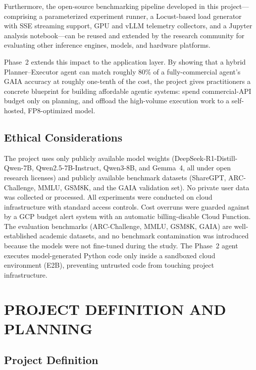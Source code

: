 \documentclass[a4paper,12pt]{report}
\begin{document}
Furthermore, the open-source benchmarking pipeline developed in this project---comprising a parameterized experiment runner, a Locust-based load generator with SSE streaming support, GPU and vLLM telemetry collectors, and a Jupyter analysis notebook---can be reused and extended by the research community for evaluating other inference engines, models, and hardware platforms.

Phase~2 extends this impact to the application layer. By showing that a hybrid Planner--Executor agent can match roughly 80\% of a fully-commercial agent's GAIA accuracy at roughly one-tenth of the cost, the project gives practitioners a concrete blueprint for building affordable agentic systems: spend commercial-API budget only on planning, and offload the high-volume execution work to a self-hosted, FP8-optimized model.

\section{Ethical Considerations}

The project uses only publicly available model weights (DeepSeek-R1-Distill-Qwen-7B, Qwen2.5-7B-Instruct, Qwen3-8B, and Gemma~4, all under open research licenses) and publicly available benchmark datasets (ShareGPT, ARC-Challenge, MMLU, GSM8K, and the GAIA validation set). No private user data was collected or processed. All experiments were conducted on cloud infrastructure with standard access controls. Cost overruns were guarded against by a GCP budget alert system with an automatic billing-disable Cloud Function. The evaluation benchmarks (ARC-Challenge, MMLU, GSM8K, GAIA) are well-established academic datasets, and no benchmark contamination was introduced because the models were not fine-tuned during the study. The Phase~2 agent executes model-generated Python code only inside a sandboxed cloud environment (E2B), preventing untrusted code from touching project infrastructure.

\chapter{PROJECT DEFINITION AND PLANNING}

\section{Project Definition}
\end{document}
